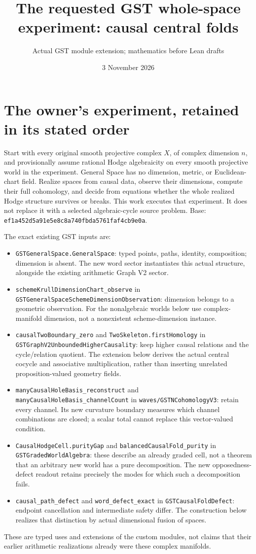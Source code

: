 \documentclass[11pt]{article}
\title{The requested GST whole-space experiment: causal central folds}
\author{Actual GST module extension; mathematics before Lean drafts}
\date{3 November 2026}
\begin{document}
\maketitle

\section{The owner's experiment, retained in its stated order}
Start with every original smooth projective complex $X$, of complex dimension
$n$, and provisionally assume rational Hodge algebraicity on every smooth
projective world in the experiment. General Space has no dimension, metric,
or Euclidean-chart field. Realize spaces from causal data, observe their
dimensions, compute their full cohomology, and decide from equations whether
the whole realized Hodge structure survives or breaks. This work executes
that experiment. It does not replace it with a selected algebraic-cycle
source problem. Base: \texttt{ef1a452d5a91e5e8c8a740fbda5761faf4cb9e0a}.

The exact existing GST inputs are:
\begin{itemize}
\item \texttt{GSTGeneralSpace.GeneralSpace}: typed points, paths, identity,
composition; dimension is absent. The new word sector instantiates this
actual structure, alongside the existing arithmetic Graph V2 sector.
\item \texttt{schemeKrullDimensionChart\_observe} in
\texttt{GSTGeneralSpaceSchemeDimensionObservation}: dimension belongs to a
geometric observation. For the nonalgebraic worlds below use complex-manifold
dimension, not a nonexistent scheme-dimension instance.
\item \texttt{causalTwoBoundary\_zero} and
\texttt{TwoSkeleton.firstHomology} in
\texttt{GSTGraphV2UnboundedHigherCausality}: keep higher causal relations
and the cycle/relation quotient. The extension below derives the actual
central cocycle and associative multiplication, rather than inserting
unrelated proposition-valued geometry fields.
\item \texttt{manyCausalHoleBasis\_reconstruct} and
\texttt{manyCausalHoleBasis\_channelCount} in
\texttt{waves/GSTNCohomologyV3}: retain every channel. Its new curvature
boundary measures which channel combinations are closed; a scalar total
cannot replace this vector-valued condition.
\item \texttt{CausalHodgeCell.purityGap} and
\texttt{balancedCausalFold\_purity} in \texttt{GSTGradedWorldAlgebra}:
these describe an already graded cell, not a theorem that an arbitrary
new world has a pure decomposition. The new opposedness-defect readout
retains precisely the modes for which such a decomposition fails.
\item \texttt{causal\_path\_defect} and
\texttt{word\_defect\_exact} in \texttt{GSTCausalFoldDefect}:
endpoint cancellation and intermediate safety differ. The construction
below realizes that distinction by actual dimensional fusion of spaces.
\end{itemize}
These are typed uses and extensions of the custom modules, not claims that
their earlier arithmetic realizations already were these complex manifolds.
\end{document}
